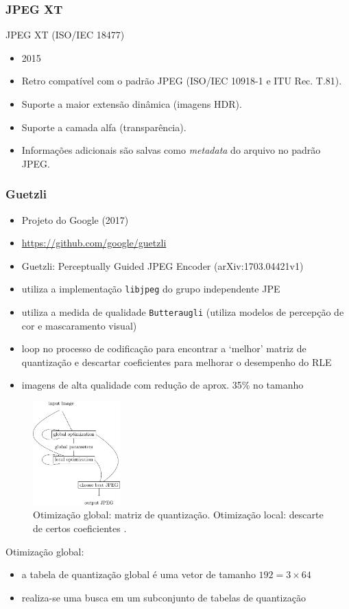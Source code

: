 \begin{frame}%
  \frametitle{JPEG XT}
  JPEG XT (ISO/IEC 18477)
  \begin{itemize}
  \item 2015
  \item Retro compatível com o padrão JPEG (ISO/IEC 10918-1 e ITU Rec. T.81).
  \item Suporte a maior extensão dinâmica (imagens HDR).
  \item Suporte a camada alfa (transparência).
  \item Informações adicionais são salvas como \textit{metadata} do arquivo no padrão JPEG.
  \end{itemize}
\end{frame}

\begin{frame}[allowframebreaks]
  \frametitle{Guetzli}

  \begin{itemize}
  \item Projeto do Google (2017)
  \item \url{https://github.com/google/guetzli}
  \item Guetzli: Perceptually Guided JPEG Encoder (arXiv:1703.04421v1)
  \item utiliza a implementação \texttt{libjpeg} do grupo independente JPE
  \item utiliza a medida de qualidade \texttt{Butteraugli} (utiliza modelos de percepção de cor e
        mascaramento visual)
  \item loop no processo de codificação para encontrar a `melhor' matriz de quantização e descartar
        coeficientes para melhorar o desempenho do RLE
  \item imagens de alta qualidade com redução de aprox. 35\% no tamanho
  \end{itemize}

  \begin{figure}[h!]
  \centering
  \includegraphics[width=0.3\textwidth]{images/guetzliloop.pdf}
  \caption{Otimização global: matriz de quantização. Otimização local: descarte de certos coeficientes \citep{guetzli}.}
  \label{fig:guetzliloop}
  \end{figure}

  Otimização global:
  \begin{itemize}
  \item a tabela de quantização global é uma vetor de tamanho $192 = 3 \times 64$
  \item realiza-se uma busca em um subconjunto de tabelas de quantização
  \end{itemize}

\end{frame}



